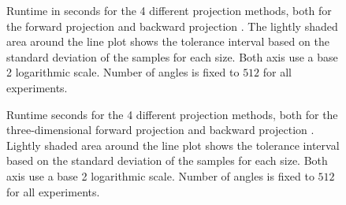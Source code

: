 \begin{figure}
	\centering


	\caption{Runtime in seconds for the 4 different projection methods, both for the forward
		projection  and backward
                projection . The lightly shaded area
                around the line plot shows the tolerance interval based on the standard deviation of
                the samples for each size. Both axis use a base 2 logarithmic scale. Number of
                angles is fixed to \(512\) for all experiments.}%
	\label{fig:performance_2d_lineplot}
\end{figure}

\begin{figure}
	\centering


	\caption{Runtime seconds for the 4 different projection methods, both for the
		three-dimensional forward projection 
		and backward projection . Lightly
		shaded area around the line plot shows the tolerance interval based on the standard
		deviation of the samples for each size. Both axis use a base 2 logarithmic scale.
		Number of angles is fixed to \(512\) for all experiments.}%
	\label{fig:performance_3d_lineplot}
\end{figure}

